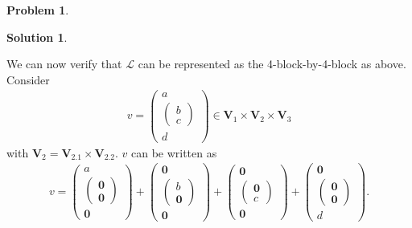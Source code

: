 \documentclass{article}
\theoremstyle{definition}
\newtheorem*{prob*}{Problem}
\newtheorem*{sln*}{Solution}
\newcommand{\V}{\mathbf{V}}
\newcommand{\lag}{\mathcal{L}}
\begin{document}
\begin{prob*}
\begin{sln*}
\begin{enumerate}
		We can now verify that $\lag$ can be represented as the 4-block-by-4-block as above. Consider
		\begin{align*}
		v = \begin{pmatrix}
		a \\ \begin{pmatrix}
		b\\c
		\end{pmatrix}\\
		d
		\end{pmatrix} \in \V_1 \times \V_2 \times \V_3
		\end{align*}
		with $\V_2 = \V_{2.1}\times \V_{2.2}$. $v$ can be written as
		\begin{align*}
		v = \begin{pmatrix}
		a \\ \begin{pmatrix}
		\mathbf{0}\\\mathbf{0}
		\end{pmatrix}\\
		\mathbf{0}
		\end{pmatrix} +
		\begin{pmatrix}
		\mathbf{0} \\ \begin{pmatrix}
		b\\\mathbf{0}
		\end{pmatrix}\\
		\mathbf{0}
		\end{pmatrix} + 
		\begin{pmatrix}
		\mathbf{0} \\ \begin{pmatrix}
		\mathbf{0} \\ c
		\end{pmatrix}\\
		\mathbf{0}
		\end{pmatrix} + 
		\begin{pmatrix}
		\mathbf{0} \\ \begin{pmatrix}
		\mathbf{0} \\ \mathbf{0}
		\end{pmatrix}\\
		d
		\end{pmatrix}.
		\end{align*}
		

\end{enumerate}
\end{sln*}
\end{prob*}
\end{document}

